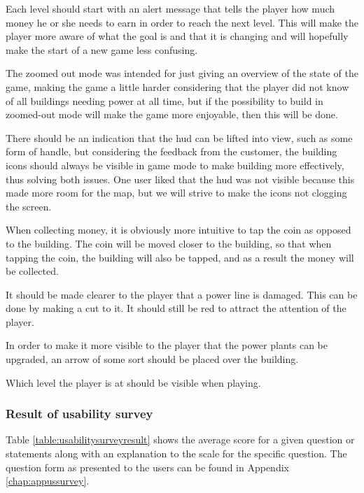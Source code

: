 	Each level should start with an alert message that tells the player how much money he or she needs to earn in order to reach the next level. This will make the player more aware of what the goal is and that it is changing and will hopefully make the start of a new game less confusing.

	The zoomed out mode was intended for just giving an overview of the state of the game, making the game a little harder considering that the player did not know of all buildings needing power at all time, but if the possibility to build in zoomed-out mode will make the game more enjoyable, then this will be done.

	There should be an indication that the hud can be lifted into view, such as some form of handle, but considering the feedback from the customer, the building icons should always be visible in game mode to make building more effectively, thus solving both issues. One user liked that the hud was not visible because this made more room for the map, but we will strive to make the icons not clogging the screen.

	When collecting money, it is obviously more intuitive to tap the coin as opposed to the building. The coin will be moved closer to the building, so that when tapping the coin, the building will also be tapped, and as a result the money will be collected.

	It should be made clearer to the player that a power line is damaged. This can be done by making a cut to it. It should still be red to attract the attention of the player.

	In order to make it more visible to the player that the power plants can be upgraded, an arrow of some sort should be placed over the building.

	Which level the player is at should be visible when playing.

	\subsubsection*{Result of usability survey}

	Table \ref{table:usabilitysurveyresult} shows the average score for a given question or statements along with an explanation to the scale for the specific question. The question form as presented to the users can be found in Appendix \ref{chap:appussurvey}.

